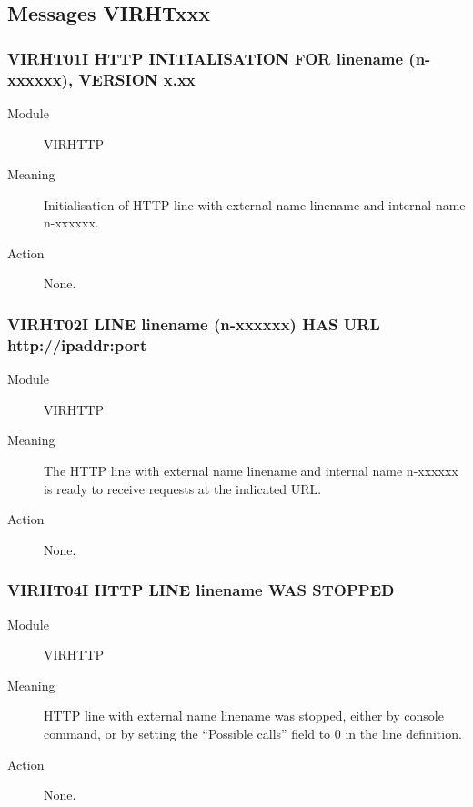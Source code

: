 \documentclass[letterpaper,10pt,english]{sphinxmanual}
\begin{document}
\subsection{Messages VIRHTxxx}
\label{\detokenize{messages:messages-virhtxxx}}

\subsubsection{VIRHT01I HTTP INITIALISATION FOR linename (n-xxxxxx), VERSION x.xx}
\label{\detokenize{messages:virht01i-http-initialisation-for-linename-n-xxxxxx-version-x-xx}}\begin{description}
\item[{Module}] \leavevmode
VIRHTTP

\item[{Meaning}] \leavevmode
Initialisation of HTTP line with external name linename and internal name n-xxxxxx.

\item[{Action}] \leavevmode
None.

\end{description}


\subsubsection{VIRHT02I LINE linename (n-xxxxxx) HAS URL http://ipaddr:port}
\label{\detokenize{messages:virht02i-line-linename-n-xxxxxx-has-url-http-ipaddr-port}}\begin{description}
\item[{Module}] \leavevmode
VIRHTTP

\item[{Meaning}] \leavevmode
The HTTP line with external name linename and internal name n-xxxxxx is ready to receive requests at the indicated URL.

\item[{Action}] \leavevmode
None.

\end{description}


\subsubsection{VIRHT04I HTTP LINE linename WAS STOPPED}
\label{\detokenize{messages:virht04i-http-line-linename-was-stopped}}\begin{description}
\item[{Module}] \leavevmode
VIRHTTP

\item[{Meaning}] \leavevmode
HTTP line with external name linename was stopped, either by console command, or by setting the “Possible calls” field to 0 in the line definition.

\item[{Action}] \leavevmode
None.

\end{description}
\end{document}
